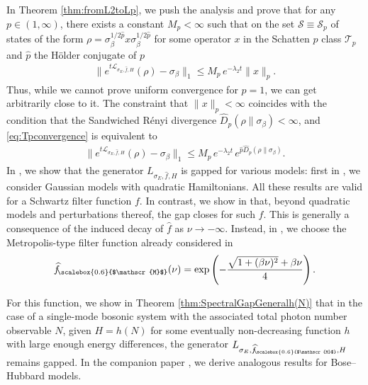 \documentclass[11pt]{amsart}
\newcommand{\1}{\mathbbm{1}}
\newcommand{\hatfM}{\widehat{f}_{\!\scalebox{0.6}{$\mathscr{M}$}}
}
\theoremstyle{plain}
\theoremstyle{definition}
\theoremstyle{remark}
\numberwithin{equation}{section}
\begin{document}
In Theorem \ref{thm:fromL2toLp}, we push the analysis and prove that for any $p\in (1,\infty)$, there exists a constant $M_p<\infty$ such that on the set $\mathscr{S}\equiv \mathscr{S}_p$ of states of the form $\rho=\sigma_{\beta}^{1/2\hat{p}}x\sigma_{\beta}^{1/2\hat{p}}$  for some operator $x$ in the Schatten $p$ class $\mathscr{T}_p$ and $\hat{p}$ the H\"{o}lder conjugate of $p$  
\begin{align}\label{eq:Tpconvergence}
\|e^{t\mathcal{L}_{\sigma_E,\widehat{f},H}}(\rho)-\sigma_\beta\|_1\le M_p\, e^{-\lambda_2 t}\|x\|_{p}.
\end{align}
Thus, while we cannot prove uniform convergence for $p=1$, we can get arbitrarily close to it. The constraint that $\|x\|_p<\infty$ coincides with the condition that the Sandwiched Rényi divergence $\widehat{D}_p(\rho\|\sigma_\beta)<\infty$, and \eqref{eq:Tpconvergence} is equivalent to
\begin{align}\label{convgapDp}
\|e^{t\mathcal{L}_{\sigma_E,\widehat{f},H}}(\rho)-\sigma_\beta\|_1\le M_p\, e^{-\lambda_2 t}\,e^{\hat{p}\widehat{D}_p(\rho\|\sigma_\beta)}.
\end{align}
In , we show that the generator $L_{\sigma_E,\widehat{f},H}$ is gapped for various models: first in , we consider Gaussian models with quadratic Hamiltonians. All these results are valid for a Schwartz filter function $f$. In contrast, we show in  that, beyond quadratic models and perturbations thereof, the gap closes for such $f$. This is generally a consequence of the induced decay of $\widehat{f}$ as $\nu\to-\infty$. Instead, in , we choose the Metropolis-type filter function already considered in \cite{ding2025efficient}
\begin{align}
\label{eq:filterFunction}
    \hatfM(\nu) = \exp\left(-\frac{\sqrt{1+(\beta\nu)^2}+ \beta\nu}{4}\right).
\end{align}


\noindent For this function, we show in Theorem \ref{thm:SpectralGapGeneralh(N)} that in the case of a single-mode bosonic system with the associated total photon number observable $N$, given $H=h(N)$ for some eventually non-decreasing function $h$ with large enough energy differences, the generator $L_{\sigma_E,\hatfM,H}$ remains gapped. 
In the companion paper \cite{BeckerRouzeSalzmannBose}, we derive analogous results for Bose--Hubbard models.
\end{document}
